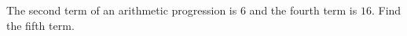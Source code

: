 The second term of an arithmetic progression is $6$ and the fourth term is $16$. Find the fifth term.
